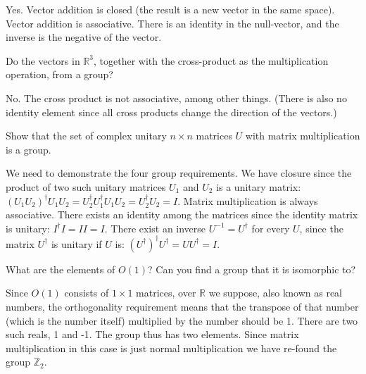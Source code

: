 \documentclass[notes.tex]{subfiles}
\begin{document}
\begin{Answer}
Yes. Vector addition is closed (the result is a new vector in the same space). Vector addition is associative. There is an identity in the null-vector, and the inverse is the negative of the vector.
\end{Answer}


\begin{Exercise}[]
Do the vectors in $\mathbb R^3$, together with the cross-product as the multiplication operation, from a group?
\end{Exercise}

\begin{Answer}
No. The cross product is not associative, among other things. (There is also no identity element since all cross products change the direction of the vectors.)
\end{Answer}

\begin{Exercise}[]
Show that the set of complex unitary $n\times n$ matrices $U$ with matrix multiplication is a group.
\end{Exercise}
\begin{Answer}
We need to demonstrate the four group requirements. We have closure since the product of two such unitary matrices $U_1$ and $U_2$ is a unitary matrix: $(U_1U_2)^\dagger U_1U_2= U_2^\dagger U_1^\dagger U_1U_2= U_2^\dagger U_2=I$. Matrix multiplication is always associative. There exists an identity among the matrices since the identity matrix is unitary: $I^\dagger I = II=I$. There exist an inverse $U^{-1}=U^\dagger$ for every $U$, since the matrix $U^\dagger$ is unitary if $U$ is: $(U^\dagger)^\dagger U^\dagger= UU^\dagger=I$.
\end{Answer}

\begin{Exercise}[]
What are the elements of $O(1)$? Can you find a group that it is isomorphic to?
\end{Exercise}
\begin{Answer}
Since $O(1)$ consists of $1\times1$ matrices, over $\mathbb R$ we suppose, also known as real numbers, the orthogonality requirement means that the transpose of that number (which is the number itself) multiplied by the number should be 1. There are two such reals, 1 and -1. The group thus has two elements. Since matrix multiplication in this case is just normal multiplication we have re-found the group $\mathbb Z_2$.
\end{Answer}
\end{document}
